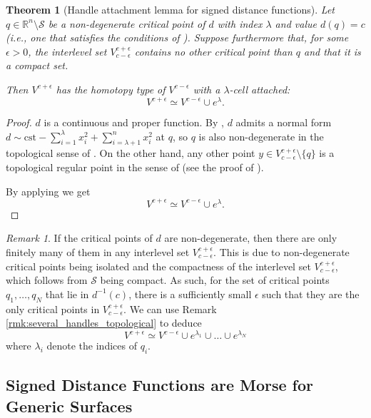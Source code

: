 \documentclass[11pt]{article}
\newcommand{\R}{\mathbb{R}}
\newcommand{\eps}{\epsilon}
\newcommand{\union}{\cup}
\newcommand{\Surf}{\mathcal{S}}
\newcommand{\level}[2]{{#1}^{-1}\left({#2}\right)}
\theoremstyle{plain}
\newtheorem{thm}{Theorem}
\theoremstyle{definition}
\theoremstyle{remark}
\newtheorem{rmk}{Remark}
\begin{document}
\begin{thm}[Handle attachment lemma for signed distance functions]
	\label{thm:dist_handle_lemma}
Let $q \in \R^n \setminus \Surf$ be a non-degenerate critical point of $d$ with index $\lambda$ and value $d(q) = c$ (i.e., one that satisfies the conditions of ). Suppose furthermore that, for some $\eps > 0$, the interlevel set $V_{c - \eps}^{c + \eps}$ contains no other critical point than $q$ and that it is a compact set. 

Then $V^{c + \eps}$ has the homotopy type of $V^{c-\eps}$ with a $\lambda$-cell attached: 
\[V^{c + \eps} \simeq V^{c-\eps} \union e^\lambda.\]
\end{thm}
\begin{proof}
$d$ is a continuous and proper function. By , $d$ admits a normal form $d \sim \mathrm{cst} - \sum_{i = 1}^{\lambda} x_i^2 + \sum_{i = \lambda + 1}^{n} x_i^2 $ at $q$, so $q$ is also non-degenerate in the topological sense of .
On the other hand, any other point $y \in V_{c - \eps}^{c + \eps} \setminus \{q\}$ is a topological regular point in the sense of  (see the proof of ).

By applying  we get
\[V^{c+\eps} \simeq V^{c-\eps} \union e^\lambda.\]
\end{proof}

\begin{rmk}
If the critical points of $d$ are non-degenerate, then there are only finitely many of them in any interlevel set $V_{c - \eps}^{c + \eps}$. This is due to non-degenerate critical points being isolated and the compactness of the interlevel set $V_{c - \eps}^{c + \eps}$, which follows from $\Surf$ being compact. As such, for the set of critical points $q_1, \ldots, q_N$ that lie in $\level{d}{c}$, there is a sufficiently small $\epsilon$ such that they are the only critical points in  $V_{c - \eps}^{c + \eps}$. We can use Remark \ref{rmk:several_handles_topological} to deduce
\[V^{c+\eps} \simeq V^{c-\eps} \union e^{\lambda_1} \union \ldots \union e^{\lambda_N}\]
where $\lambda_i$ denote the indices of $q_i$.
\end{rmk}


\subsection{Signed Distance Functions are Morse for Generic Surfaces}
\label{sec:genericity}
\end{document}
